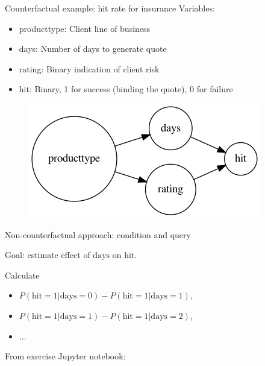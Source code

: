 \begin{frame}{Counterfactual example: hit rate for insurance}
    Variables:
    \begin{itemize}
        \item producttype: Client line of business
        \item days: Number of days to generate quote
        \item rating: Binary indication of client risk
        \item hit: Binary, 1 for success (binding the quote), 0 for failure\newline
    \end{itemize}

    \begin{figure}[ht]
        \includegraphics[height=0.4\textheight]{graphics/hits}
    \end{figure}
\end{frame}

\begin{frame}{Non-counterfactual approach: condition and query}

    Goal: estimate effect of $\textrm{days}$ on $\textrm{hit}$.\newline

    Calculate
    \begin{itemize}
        \item $P(\textrm{hit}=1 | \textrm{days} = 0) - P(\textrm{hit}=1 | \textrm{days} = 1)$,
        \item $P(\textrm{hit}=1 | \textrm{days} = 1) - P(\textrm{hit}=1 | \textrm{days} = 2)$,
        \item $\ldots$ \newline
    \end{itemize}

    From exercise Jupyter notebook:\newline
    
\end{frame}



